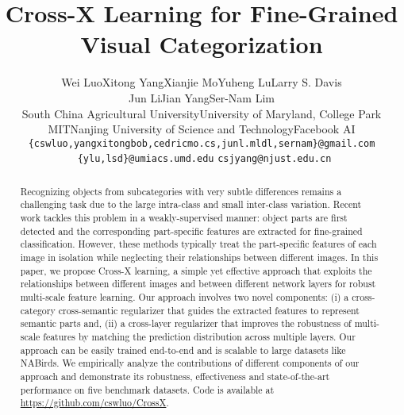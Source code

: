 \documentclass[10pt,twocolumn,letterpaper]{article}
\begin{document}
\title{Cross-X Learning for Fine-Grained Visual Categorization}

\author{Wei Luo\quad Xitong Yang\quad Xianjie Mo\quad Yuheng Lu\quad Larry S. Davis\\ Jun Li\quad Jian Yang\quad Ser-Nam Lim\\
South China Agricultural University\quad University of Maryland, College Park\\
MIT\quad Nanjing University of Science and Technology\quad Facebook AI\\
{\tt\small \{cswluo,yangxitongbob,cedricmo.cs,junl.mldl,sernam\}@gmail.com}\\\
{\tt\small \{ylu,lsd\}@umiacs.umd.edu}\quad
{\tt\small csjyang@njust.edu.cn}
}

\maketitle
\ificcvfinal\thispagestyle{empty}\fi

\begin{abstract}
Recognizing objects from subcategories with very subtle differences remains a challenging task due to the large intra-class and small inter-class variation.
Recent work tackles this problem in a weakly-supervised manner: object parts are first detected and the corresponding part-specific features are extracted for fine-grained classification.
However, these methods typically treat the part-specific features of each image in isolation while neglecting their relationships between different images.
In this paper, we propose Cross-X learning, a simple yet effective approach that exploits the relationships between different images and between different network layers for robust multi-scale feature learning.
Our approach involves two novel components: (i) a cross-category cross-semantic regularizer that guides the extracted features to represent semantic parts and, (ii) a cross-layer regularizer that improves the robustness of multi-scale features by matching the prediction distribution across multiple layers.
Our approach can be easily trained end-to-end and is scalable to large datasets like NABirds.
We empirically analyze the contributions of different components of our approach and  demonstrate  its  robustness, effectiveness  and state-of-the-art performance on five benchmark datasets.
Code is available at \url{https://github.com/cswluo/CrossX}.
\end{abstract}
\end{document}

